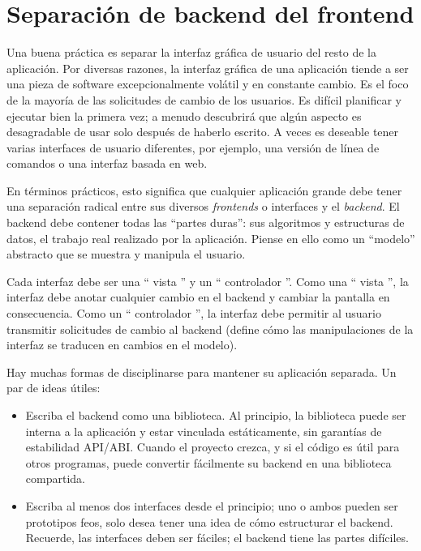 \section{Separación de backend del frontend}
\label{intro-backend-frontend-separation}
Una buena práctica es separar la interfaz gráfica de usuario del resto de la aplicación. Por diversas razones, la interfaz gráfica de una aplicación tiende a ser una pieza de software excepcionalmente volátil y en constante cambio. Es el foco de la mayoría de las solicitudes de cambio de los usuarios. Es difícil planificar y ejecutar bien la primera vez; a menudo descubrirá que algún aspecto es desagradable de usar solo después de haberlo escrito. A veces es deseable tener varias interfaces de usuario diferentes, por ejemplo, una versión de línea de comandos o una interfaz basada en web.

En términos prácticos, esto significa que cualquier aplicación grande debe tener una separación radical entre sus diversos \emph{frontends} o interfaces y el \emph{backend}. El backend debe contener todas las ``partes duras'': sus algoritmos y estructuras de datos, el trabajo real realizado por la aplicación. Piense en ello como un ``modelo'' abstracto que se muestra y manipula el usuario.

Cada interfaz debe ser una `` vista '' y un `` controlador ''. Como una `` vista '', la interfaz debe anotar cualquier cambio en el backend y cambiar la pantalla en consecuencia. Como un `` controlador '', la interfaz debe permitir al usuario transmitir solicitudes de cambio al backend (define cómo las manipulaciones de la interfaz se traducen en cambios en el modelo).

Hay muchas formas de disciplinarse para mantener su aplicación separada. Un par de ideas útiles:

\begin{itemize}
    \item Escriba el backend como una biblioteca. Al principio, la biblioteca puede ser interna a la aplicación y estar vinculada estáticamente, sin garantías de estabilidad API/ABI. Cuando el proyecto crezca, y si el código es útil para otros programas, puede convertir fácilmente su backend en una biblioteca compartida.
    \item Escriba al menos dos interfaces desde el principio; uno o ambos pueden ser prototipos feos, solo desea tener una idea de cómo estructurar el backend. Recuerde, las interfaces deben ser fáciles; el backend tiene las partes difíciles.
\end{itemize}


